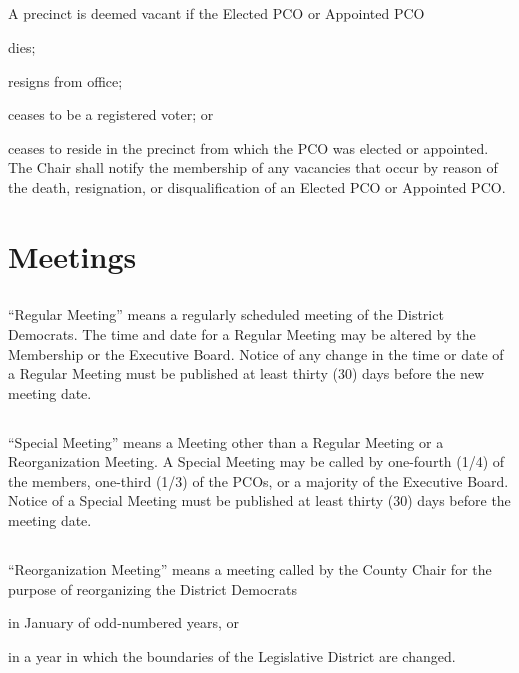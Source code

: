 \subsection{}
A precinct is deemed vacant if the Elected PCO or Appointed PCO
\begin{inlinealphalist}
    \item dies;
    \item resigns from office;
    \item ceases to be a registered voter; or
    \item ceases to reside in the precinct from which the PCO was elected or appointed. The Chair shall notify the membership of any vacancies that occur by reason of the death, resignation, or disqualification of an Elected PCO or Appointed PCO.
\end{inlinealphalist}

\section{Meetings}
\subsection{} \label{regular-meeting}
“Regular Meeting” means a regularly scheduled meeting of the \fortythird{} District Democrats. The time and date for a Regular Meeting may be altered by the Membership or the Executive Board. Notice of any change in the time or date of a Regular Meeting must be published at least thirty (30) days before the new meeting date.

\subsection{} \label{special-meeting}
“Special Meeting” means a Meeting other than a Regular Meeting or a Reorganization Meeting. A Special Meeting may be called by one-fourth (1/4) of the members, one-third (1/3) of the PCOs, or a majority of the Executive Board. Notice of a Special Meeting must be published at least thirty (30) days before the meeting date.

\subsection{} \label{reorg-meeting}
“Reorganization Meeting” means a meeting called by the County Chair for the purpose of reorganizing the \fortythird{} District Democrats
\begin{inlinealphalist}
    \item in January of odd-numbered years, or
    \item in a year in which the boundaries of the \fortythird{} Legislative District are changed.
\end{inlinealphalist}

